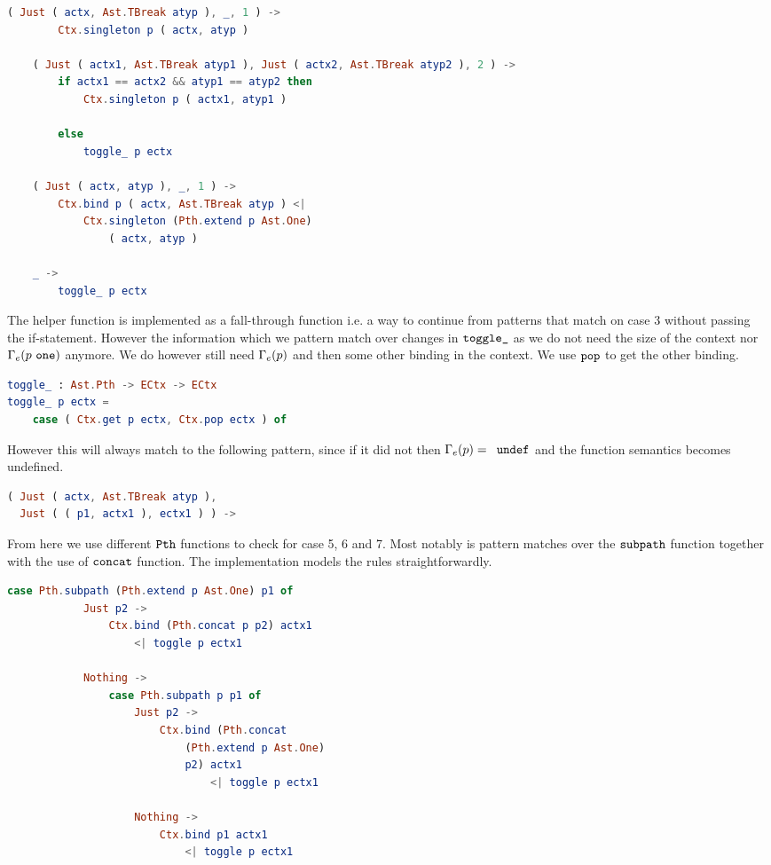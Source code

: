 \begin{lstlisting}[language=elm,%
    gobble=4,%
    ]
    ( Just ( actx, Ast.TBreak atyp ), _, 1 ) ->
        Ctx.singleton p ( actx, atyp )

    ( Just ( actx1, Ast.TBreak atyp1 ), Just ( actx2, Ast.TBreak atyp2 ), 2 ) ->
        if actx1 == actx2 && atyp1 == atyp2 then
            Ctx.singleton p ( actx1, atyp1 )

        else
            toggle_ p ectx

    ( Just ( actx, atyp ), _, 1 ) ->
        Ctx.bind p ( actx, Ast.TBreak atyp ) <|
            Ctx.singleton (Pth.extend p Ast.One)
                ( actx, atyp )

    _ ->
        toggle_ p ectx
\end{lstlisting}
The helper function  is implemented as a fall-through function
i.e. a way to continue from patterns that match on case 3 without passing the
if-statement. However the information which we pattern match over changes in
$\texttt{toggle\_}$ as we do not need the size of the context nor
$\Gamma_{e}(p~\texttt{one})$ anymore. We do however still need $\Gamma_{e}(p)$ and
then some other binding in the context. We use $\texttt{pop}$ to get the other
binding.
\begin{lstlisting}[language=elm,%
    gobble=0,%
    ]
toggle_ : Ast.Pth -> ECtx -> ECtx
toggle_ p ectx =
    case ( Ctx.get p ectx, Ctx.pop ectx ) of
\end{lstlisting}
However this will always match to the following pattern, since if it did not
then $\Gamma_{e}(p) = \texttt{ undef}$ and the function semantics becomes
undefined.
\begin{lstlisting}[language=elm,%
    gobble=0,%
    ]
( Just ( actx, Ast.TBreak atyp ),
  Just ( ( p1, actx1 ), ectx1 ) ) ->
\end{lstlisting}
From here we use different $\texttt{Pth}$ functions to check for case 5, 6 and 7.
Most notably is pattern matches over the $\texttt{subpath}$ function together with
the use of $\texttt{concat}$ function. The implementation models the rules
straightforwardly.
\begin{lstlisting}[language=elm,%
    gobble=8,%
    ]
        case Pth.subpath (Pth.extend p Ast.One) p1 of
            Just p2 ->
                Ctx.bind (Pth.concat p p2) actx1
                    <| toggle p ectx1

            Nothing ->
                case Pth.subpath p p1 of
                    Just p2 ->
                        Ctx.bind (Pth.concat
                            (Pth.extend p Ast.One)
                            p2) actx1
                                <| toggle p ectx1

                    Nothing ->
                        Ctx.bind p1 actx1
                            <| toggle p ectx1
\end{lstlisting}

